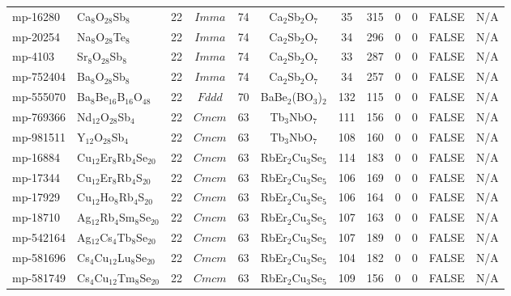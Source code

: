 {\begin{longtable}{llcccccccccc}
    mp-16280 & Ca$_{8}$O$_{28}$Sb$_{8}$ & 22    & $Imma$ & 74    & Ca$_{2}$Sb$_{2}$O$_{7}$ & 35    & 315   & 0     & 0     & FALSE & N/A \\
    mp-20254 & Na$_{8}$O$_{28}$Te$_{8}$ & 22    & $Imma$ & 74    & Ca$_{2}$Sb$_{2}$O$_{7}$ & 34    & 296   & 0     & 0     & FALSE & N/A \\
    mp-4103 & Sr$_{8}$O$_{28}$Sb$_{8}$ & 22    & $Imma$ & 74    & Ca$_{2}$Sb$_{2}$O$_{7}$ & 33    & 287   & 0     & 0     & FALSE & N/A \\
    mp-752404 & Ba$_{8}$O$_{28}$Sb$_{8}$ & 22    & $Imma$ & 74    & Ca$_{2}$Sb$_{2}$O$_{7}$ & 34    & 257   & 0     & 0     & FALSE & N/A \\
    mp-555070 & Ba$_{8}$Be$_{16}$B$_{16}$O$_{48}$ & 22    & $Fddd$ & 70    & BaBe$_{2}$(BO$_{3}$)$_{2}$ & 132   & 115   & 0     & 0     & FALSE & N/A \\
    mp-769366 & Nd$_{12}$O$_{28}$Sb$_{4}$ & 22    & $Cmcm$ & 63    & Tb$_{3}$NbO$_{7}$ & 111   & 156   & 0     & 0     & FALSE & N/A \\
    mp-981511 & Y$_{12}$O$_{28}$Sb$_{4}$ & 22    & $Cmcm$ & 63    & Tb$_{3}$NbO$_{7}$ & 108   & 160   & 0     & 0     & FALSE & N/A \\
    mp-16884 & Cu$_{12}$Er$_{8}$Rb$_{4}$Se$_{20}$ & 22    & $Cmcm$ & 63    & RbEr$_{2}$Cu$_{3}$Se$_{5}$ & 114   & 183   & 0     & 0     & FALSE & N/A \\
    mp-17344 & Cu$_{12}$Er$_{8}$Rb$_{4}$S$_{20}$ & 22    & $Cmcm$ & 63    & RbEr$_{2}$Cu$_{3}$Se$_{5}$ & 106   & 169   & 0     & 0     & FALSE & N/A \\
    mp-17929 & Cu$_{12}$Ho$_{8}$Rb$_{4}$S$_{20}$ & 22    & $Cmcm$ & 63    & RbEr$_{2}$Cu$_{3}$Se$_{5}$ & 106   & 164   & 0     & 0     & FALSE & N/A \\
    mp-18710 & Ag$_{12}$Rb$_{4}$Sm$_{8}$Se$_{20}$ & 22    & $Cmcm$ & 63    & RbEr$_{2}$Cu$_{3}$Se$_{5}$ & 107   & 163   & 0     & 0     & FALSE & N/A \\
    mp-542164 & Ag$_{12}$Cs$_{4}$Tb$_{8}$Se$_{20}$ & 22    & $Cmcm$ & 63    & RbEr$_{2}$Cu$_{3}$Se$_{5}$ & 107   & 189   & 0     & 0     & FALSE & N/A \\
    mp-581696 & Cs$_{4}$Cu$_{12}$Lu$_{8}$Se$_{20}$ & 22    & $Cmcm$ & 63    & RbEr$_{2}$Cu$_{3}$Se$_{5}$ & 104   & 182   & 0     & 0     & FALSE & N/A \\
    mp-581749 & Cs$_{4}$Cu$_{12}$Tm$_{8}$Se$_{20}$ & 22    & $Cmcm$ & 63    & RbEr$_{2}$Cu$_{3}$Se$_{5}$ & 109   & 156   & 0     & 0     & FALSE & N/A \\

\end{longtable}}
